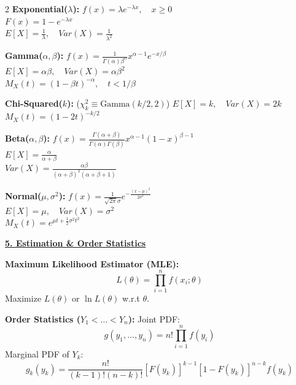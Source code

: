 \documentclass{article}
\newcommand{\sectiontitle}[1]{\vspace{0.2cm}\textbf{\large \underline{#1}}\vspace{0.1cm}}
\newcommand{\distname}[1]{\textbf{#1}}
\begin{document}
\begin{multicols*}{2}
\distname{Exponential($\lambda$):}
$f(x) = \lambda e^{-\lambda x}, \quad x \ge 0$
\\ $F(x) = 1 - e^{-\lambda x}$
\\ $E[X] = \frac{1}{\lambda}, \quad Var(X) = \frac{1}{\lambda^2}$

\distname{Gamma($\alpha, \beta$):}
$f(x) = \frac{1}{\Gamma(\alpha)\beta^\alpha} x^{\alpha-1} e^{-x/\beta}$
\\ $E[X] = \alpha\beta, \quad Var(X) = \alpha\beta^2$
\\ $M_X(t) = (1-\beta t)^{-\alpha}, \quad t < 1/\beta$

\distname{Chi-Squared($k$):} ($\chi^2_k \equiv \text{Gamma}(k/2, 2)$)
$E[X] = k, \quad Var(X) = 2k$
\\ $M_X(t) = (1-2t)^{-k/2}$

\distname{Beta($\alpha, \beta$):}
$f(x) = \frac{\Gamma(\alpha+\beta)}{\Gamma(\alpha)\Gamma(\beta)} x^{\alpha-1}(1-x)^{\beta-1}$
\\ $E[X] = \frac{\alpha}{\alpha+\beta}$
\\ $Var(X) = \frac{\alpha\beta}{(\alpha+\beta)^2 (\alpha+\beta+1)}$

\distname{Normal($\mu, \sigma^2$):}
$f(x) = \frac{1}{\sqrt{2\pi}\sigma} e^{-\frac{(x-\mu)^2}{2\sigma^2}}$
\\ $E[X] = \mu, \quad Var(X) = \sigma^2$
\\ $M_X(t) = e^{\mu t + \frac{1}{2}\sigma^2 t^2}$

\sectiontitle{5. Estimation \& Order Statistics}

\distname{Maximum Likelihood Estimator (MLE):}
\[ L(\theta) = \prod_{i=1}^n f(x_i; \theta) \]
Maximize $L(\theta)$ or $\ln L(\theta)$ w.r.t $\theta$.

\distname{Order Statistics ($Y_1 < \dots < Y_n$):}
Joint PDF:
\[ g(y_1, \dots, y_n) = n! \prod_{i=1}^n f(y_i) \]
Marginal PDF of $Y_k$:
\[ g_k(y_k) = \frac{n!}{(k-1)!(n-k)!} [F(y_k)]^{k-1} [1-F(y_k)]^{n-k} f(y_k) \]

\end{multicols*}
\end{document}
